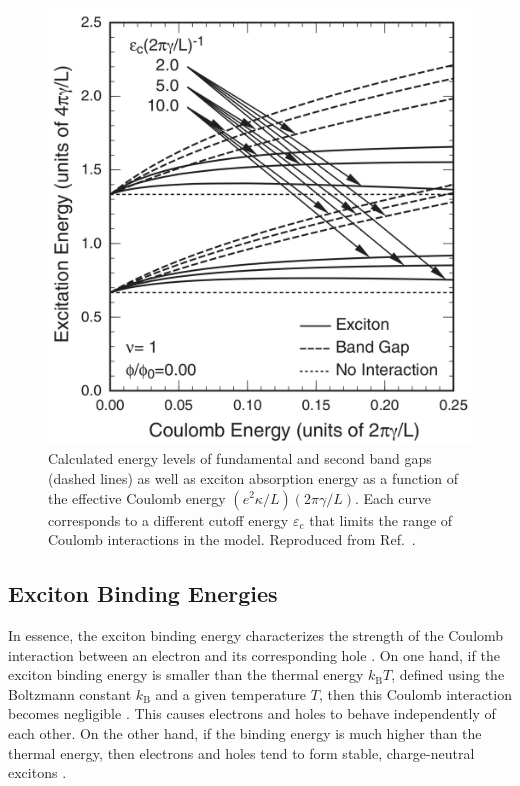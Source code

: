 \begin{figure}[ht]
	\centering
	\includegraphics[scale=0.25]{images/chapter_optical_props/coulomb_shift_ando}
	\caption{Calculated energy levels of fundamental and second band gaps (dashed lines) as well as exciton absorption energy as a function of the effective Coulomb energy $(e^2 \kappa / L) (2 \pi \gamma / L)$. Each curve corresponds to a different cutoff energy $\varepsilon_\text{c}$ that limits the range of Coulomb interactions in the model. Reproduced from Ref.\ \cite{ando2005theory}.}
	\label{fig:coulomb_shift}
\end{figure}



\subsection{Exciton Binding Energies}

In essence, the exciton binding energy characterizes the strength of the Coulomb interaction between an electron and its corresponding hole \cite{valkunas2006exciton}. On one hand, if the exciton binding energy is smaller than the thermal energy $k_\text{B} T$, defined using the Boltzmann constant $k_\text{B}$ and a given temperature $T$, then this Coulomb interaction becomes negligible \cite{valkunas2006exciton}. This causes electrons and holes to behave independently of each other. On the other hand, if the binding energy is much higher than the thermal energy, then electrons and holes tend to form stable, charge-neutral excitons \cite{valkunas2006exciton}.

